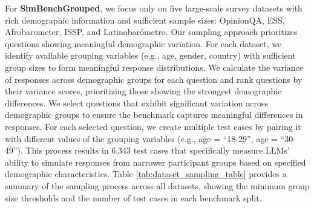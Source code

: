 \documentclass{article} %
\begin{document}
For \textbf{SimBenchGrouped}, we focus only on five large-scale survey datasets with rich demographic information and sufficient sample sizes: OpinionQA, ESS, Afrobarometer, ISSP, and Latinobarómetro. Our sampling approach prioritizes questions showing meaningful demographic variation. For each dataset, we identify available grouping variables (e.g., age, gender, country) with sufficient group sizes to form meaningful response distributions. We calculate the variance of responses across demographic groups for each question and rank questions by their variance scores, prioritizing those showing the strongest demographic differences. We select questions that exhibit significant variation across demographic groups to ensure the benchmark captures meaningful differences in responses. For each selected question, we create multiple test cases by pairing it with different values of the grouping variables (e.g., age = ``18-29'', age = ``30-49''). This process results in 6,343 test cases that specifically measure LLMs' ability to simulate responses from narrower participant groups based on specified demographic characteristics.
Table \ref{tab:dataset_sampling_table} provides a summary of the sampling process across all datasets, showing the minimum group size thresholds and the number of test cases in each benchmark split.
\end{document}
